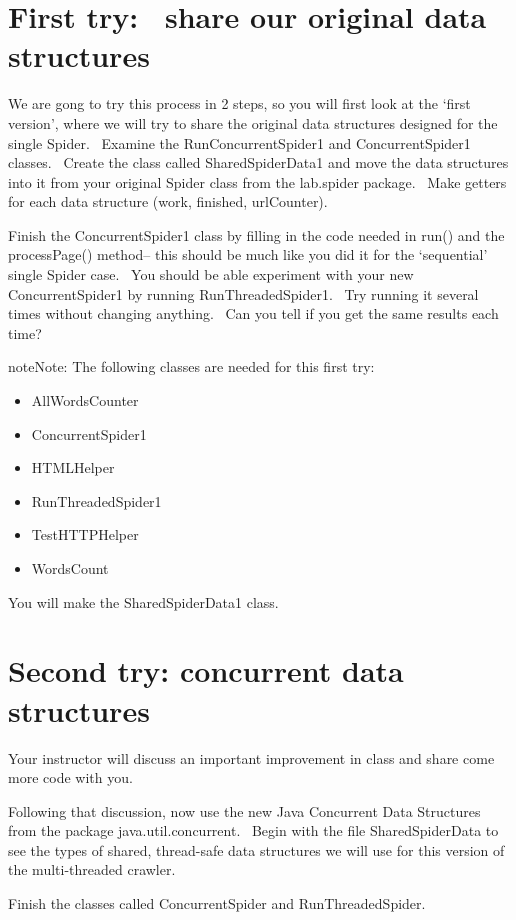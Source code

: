\documentclass[letterpaper,10pt,openany,oneside]{sphinxmanual}
\begin{document}
\section{First try:  share our original data structures}
\label{SpiderLabpart2/SpiderLabpart2:first-try-share-our-original-data-structures}
We are gong to try this process in 2 steps, so you will first look
at the ‘first version’, where we will try to share the original
data structures designed for the single Spider.  Examine the
RunConcurrentSpider1 and ConcurrentSpider1 classes.  Create the
class called SharedSpiderData1 and move the data structures into it
from your original Spider class from the lab.spider package.  Make
getters for each data structure (work, finished, urlCounter).

Finish the ConcurrentSpider1 class by filling in the code needed in
run() and the processPage() method-- this should be much like you
did it for the ‘sequential’ single Spider case.  You should be able
experiment with your new ConcurrentSpider1 by running
RunThreadedSpider1.  Try running it several times without changing
anything.  Can you tell if you get the same results each time?

\begin{notice}{note}{Note:}
The following classes are needed for this first try:
\begin{itemize}
\item {} 
AllWordsCounter

\item {} 
ConcurrentSpider1

\item {} 
HTMLHelper

\item {} 
RunThreadedSpider1

\item {} 
TestHTTPHelper

\item {} 
WordsCount

\end{itemize}

You will make the SharedSpiderData1 class.
\end{notice}


\section{Second try: concurrent data structures}
\label{SpiderLabpart2/SpiderLabpart2:second-try-concurrent-data-structures}
Your instructor will discuss an important improvement in class and
share come more code with you.

Following that discussion, now use the new Java Concurrent Data
Structures from the package java.util.concurrent.  Begin with the
file SharedSpiderData to see the types of shared, thread-safe data
structures we will use for this version of the multi-threaded
crawler.

Finish the classes called ConcurrentSpider and RunThreadedSpider.



\renewcommand{\indexname}{Index}
\printindex
\end{document}
